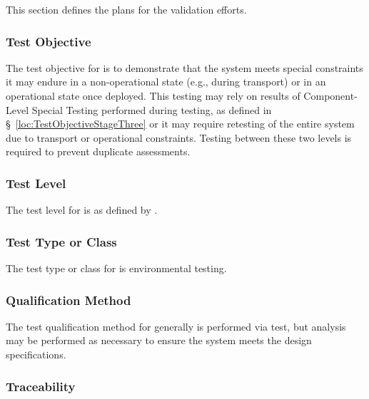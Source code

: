 


This section defines the plans for the \TestIdNameX validation efforts.

\subsubsection{Test Objective}
\label{loc:TestObjective\TestIdName}

The test objective for \TestIdNameX is to demonstrate that the system meets special constraints it may endure in a non-operational state (e.g., during transport) or in an operational state once deployed.
This testing may rely on results of Component-Level Special Testing performed during \StageThree testing, as defined in \S~\ref{loc:TestObjectiveStageThree} or it may require retesting of the entire system due to transport or operational constraints.
Testing between these two levels is required to prevent duplicate assessments.

\subsubsection{Test Level}
\label{loc:TestLevels\TestIdName}

The test level for \TestIdNameX is \StageSix as defined by \citeStageTestingSTD.

\subsubsection{Test Type or Class}
\label{loc:TestType\TestIdName}

The test type or class for \TestIdNameX is environmental testing.

\subsubsection{Qualification Method}
\label{loc:TestQualificationMethod\TestIdName}

The test qualification method for \TestIdNameX generally is performed via test, but analysis may be performed as necessary to ensure the system meets the design specifications.

\subsubsection{Traceability}
\label{loc:TestTraceability\TestIdName}

